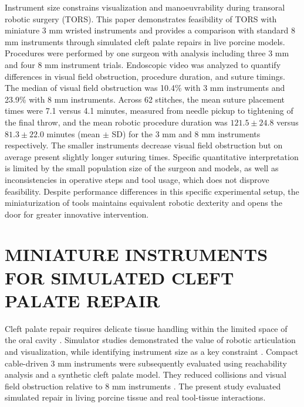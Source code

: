 \begin{PRSabstract}
Instrument size constrains visualization and manoeuvrability during transoral robotic surgery (TORS). This paper demonstrates feasibility of TORS with miniature 3 mm wristed instruments and provides a comparison with standard 8 mm instruments through simulated cleft palate repairs in live porcine models. Procedures were performed by one surgeon with analysis including three 3 mm and four 8 mm instrument trials. Endoscopic video was analyzed to quantify differences in visual field obstruction, procedure duration, and suture timings. The median of visual field obstruction was 10.4\% with 3 mm instruments and 23.9\% with 8 mm instruments. Across 62 stitches, the mean suture placement times were 7.1 versus 4.1 minutes, measured from needle pickup to tightening of the final throw, and the mean robotic procedure duration was \(121.5 \pm 24.8\) versus \(81.3 \pm 22.0\) minutes (mean \(\pm\) SD) for the 3 mm and 8 mm instruments respectively.  The smaller instruments decrease visual field obstruction but on average present slightly longer suturing times. Specific quantitative interpretation is limited by the small population size of the surgeon and models, as well as inconsistencies in operative steps and tool usage, which does not disprove feasibility. Despite performance differences in this specific experimental setup, the miniaturization of tools maintains equivalent robotic dexterity and opens the door for greater innovative intervention.

\end{PRSabstract}
\PRSstartbody


\section*{MINIATURE INSTRUMENTS FOR SIMULATED CLEFT PALATE REPAIR}
Cleft palate repair requires delicate tissue handling within the limited space of the oral cavity \cite{podolsky2017simulator}. Simulator studies demonstrated the value of robotic articulation and visualization, while identifying instrument size as a key constraint \cite{podolsky2017robotic}.
Compact cable-driven 3 mm instruments were subsequently evaluated using reachability analysis and a synthetic cleft palate model. They reduced collisions and visual field obstruction relative to 8 mm instruments \cite{maguire2025}. The present study evaluated simulated repair in living porcine tissue and real tool-tissue interactions.

